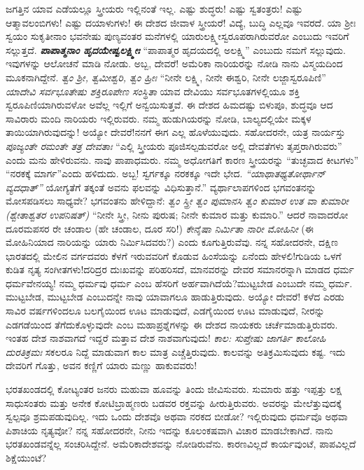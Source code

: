 ಜಗತ್ತಿನ ಯಾವ ಎಡೆಯಲ್ಲೂ ಸ್ತ್ರೀಯರು ಇಲ್ಲಿನಂತೆ ಇಲ್ಲ. ಎಷ್ಟು ಶುದ್ಧರು! ಎಷ್ಟು ಸ್ವತಂತ್ರರು! ಎಷ್ಟು ಆತ್ಮಾವಲಂಬಿಗಳು! ಎಷ್ಟು ದಯಾಳುಗಳು! ಈ ದೇಶದ ಜೀವಾಳ ಸ್ತ್ರೀಯರೆ! ವಿದ್ಯೆ, ಬುದ್ಧಿ ಎಲ್ಲವೂ ಇವರದೆ. ಯಾ ಶ‍್ರೀಃ ಸ್ವಯಂ ಸುಕೃತೀನಾಂ ಭವನೇಷು ಪುಣ್ಯವಂತರ ಮನೆಗಳಲ್ಲಿ ಯಾರುಲಕ್ಷ್ಮೀಸ್ವರೂಪರಾಗಿರುವರೋ ಎಂಬುದು ಇವರಿಗೆ ಸಲ್ಲುತ್ತದೆ. \textbf{\textit{ಪಾಪಾತ್ಮನಾಂ ಹೃದಯೇಷ್ವಲಕ್ಷ್ಮೀಃ}} “ಪಾಪಾತ್ಮರ ಹೃದಯದಲ್ಲಿ ಅಲಕ್ಷ್ಮಿ” ಎಂಬುದು ನಮಗೆ ಸಲ್ಲುವುದು. ಇವುಗಳನ್ನು ಆಲೋಚನೆ ಮಾಡಿ ನೋಡು. ಅಬ್ಬ, ದೇವರೆ! ಅಮೆರಿಕಾ ನಾರಿಯರನ್ನು ನೋಡಿ ನಾನು ವಿಸ್ಮಯದಿಂದ ಮೂಕನಾಗಿದ್ದೇನೆ. \textit{ತ್ವಂ ಶ‍್ರೀ, ತ್ವಮೀಶ್ವರಿ, ತ್ವಂ ಹ್ರೀಃ} “ನೀನೇ ಲಕ್ಷ್ಮಿ, ನೀನೇ ಈಶ್ವರಿ, ನೀನೇ ಲಜ್ಜಾಸ್ವರೂಪಿಣಿ” \textit{ಯಾದೇವಿ ಸರ್ವಭೂತೇಷು ಶಕ್ತಿರೂಪೇಣ ಸಂಸ್ಥಿತಾ} ಯಾವ ದೇವಿಯು ಸರ್ವಭೂತಗಳಲ್ಲಿಯೂ ಶಕ್ತಿ ಸ್ವರೂಪಿಣಿಯಾಗಿರುವಳೋ \enginline{-} ಅವೆಲ್ಲ ಇಲ್ಲಿಗೆ ಅನ್ವಯಿಸುತ್ತವೆ. ಈ ದೇಶದ ಹಿಮದಷ್ಟು ಬಿಳುಪೂ, ಶುದ್ಧವೂ ಆದ ಸಾವಿರಾರು ಮಂದಿ ನಾರಿಯರು ಇಲ್ಲಿರುವರು. ನಮ್ಮ ಹುಡುಗಿಯರನ್ನು ನೋಡಿ, ಬಾಲ್ಯದಲ್ಲಿಯೇ ಮಕ್ಕಳ ತಾಯಿಯಾಗಿರುವುದನ್ನು! ಅಯ್ಯೋ ದೇವರೆ!ನನಗೆ ಈಗ ಎಲ್ಲ ಹೊಳೆಯುವುದು. ಸಹೋದರನೇ, ಯತ್ರ ನಾರ್ಯಸ್ತು \textit{ಪೂಜ್ಯಂತೇ ರಮಂತೇ ತತ್ರ ದೇವತಾಃ} “ಎಲ್ಲಿ ಸ್ತ್ರೀಯರು ಪೂಜಿಸಲ್ಪಡುವರೋ ಅಲ್ಲಿ ದೇವತೆಗಳು ತೃಪ್ತರಾಗಿರುವರು” ಎಂದು ಮನು ಹೇಳಿರುವನು. ನಾವು ಪಾಪಾಧಮರು. ನಮ್ಮ ಅಧೋಗತಿಗೆ ಕಾರಣ ಸ್ತ್ರೀಯರನ್ನು “ತುಚ್ಛವಾದ ಕೀಟಗಳು” “ನರಕಕ್ಕೆ ಮಾರ್ಗ”ಎಂದು ಹಳಿದುದು. ಅಬ್ಬ! ಸ್ವರ್ಗಕ್ಕೂ ನರಕಕ್ಕೂ ಇದೇ ಭೇದ. \textit{ “ಯಾಥಾತಥ್ಯತೋರ್ಥಾನ್ ವ್ಯದಧಾತ್”} ಯೋಗ್ಯತೆಗೆ ತಕ್ಕಂತೆ ಅವನು ಫಲವನ್ನು ವಿಧಿಸುತ್ತಾನೆ.” ವ್ಯರ್ಥಾಲಾಪಗಳಿಂದ ಭಗವಂತನನ್ನು ಮೋಸಪಡಿಸಲು ಸಾಧ್ಯವೇ? ಭಗವಂತನು ಹೇಳಿದ್ದಾನೆ: \textit{ತ್ವಂ ಸ್ತ್ರೀ ತ್ವಂ ಪುಮಾನಸಿ ತ್ವಂ ಕುಮಾರ ಉತ ವಾ ಕುಮಾರೀ (ಶ್ವೇತಾಶ್ವತರ ಉಪನಿಷತ್)} “ನೀನೇ ಸ್ತ್ರೀ, ನೀನು ಪುರುಷ; ನೀನೇ ಕುಮಾರ ಮತ್ತು ಕುಮಾರಿ.” ಆದರೆ ನಾವಾದರೋ ದೂರಮಪಸರ ರೇ ಚಂಡಾಲ (ಹೇ ಚಂಡಾಲ, ದೂರ ಸರಿ!) \textit{ಕೇನೈಷಾ ನಿರ್ಮಿತಾ ನಾರೀ ಮೋಹಿನೀ} (ಈ ಮೋಹಿನಿಯಾದ ನಾರಿಯನ್ನು ಯಾರು ನಿರ್ಮಿಸಿದವರು?) ಎಂದು ಕೂಗುತ್ತಿರುವೆವು. ನನ್ನ ಸಹೋದರನೇ, ದಕ್ಷಿಣ ಭಾರತದಲ್ಲಿ ಮೇಲಿನ ವರ್ಗದವರು ಕೆಳಗೆ ಇರುವವರಿಗೆ ಕೊಡುವ ಹಿಂಸೆಯನ್ನು ಏನೆಂದು ಹೇಳಲಿ!ಗುಡಿಯ ಒಳಗೆ ಕುಡಿತ ನೃತ್ಯ ಸಂಗೀತಗಳು!ದರಿದ್ರರ ದುಃಖವನ್ನು ಪರಿಹರಿಸದೆ, ಮಾನವರನ್ನು ದೇವರ ಸಮಾನರನ್ನಾಗಿ ಮಾಡದ ಧರ್ಮ ಧರ್ಮವೇನಯ್ಯ! ನಮ್ಮ ಧರ್ಮವು ಧರ್ಮ ಎಂಬ ಹೆಸರಿಗೆ ಅರ್ಹವಾಗಿದೆಯೆ?ಮುಟ್ಟಬೇಡ ಎಂಬುದೇ ನಮ್ಮ ಧರ್ಮ. ಮುಟ್ಟಬೇಡ, ಮುಟ್ಟಬೇಡ ಎಂಬುದನ್ನೇ ನಾವು ಯಾವಾಗಲೂ ಹಾಡುತ್ತಿರುವುದು. ಅಯ್ಯೋ ದೇವರೆ! ಕಳೆದ ಎರಡು ಸಾವಿರ ವರ್ಷಗಳಿಂದಲೂ ಬಲಗೈಯಿಂದ ಊಟ ಮಾಡುವುದೆ, ಎಡಗೈಯಿಂದ ಊಟ ಮಾಡುವುದೆ, ನೀರನ್ನು ಎಡಗಡೆಯಿಂದ ತೆಗೆದುಕೊಳ್ಳುವುದೇ ಎಂಬ ಮಹಾಪ್ರಶ್ನೆಗಳನ್ನು ಈ ದೇಶದ ನಾಯಕರು ಚರ್ಚೆಮಾಡುತ್ತಿರುವರು. ಇಂತಹ ದೇಶ ನಾಶವಾಗದೆ ಇದ್ದರೆ ಮತ್ತಾವ ದೇಶ ನಾಶವಾಗುವುದು! \textit{ಕಾಲ: ಸುಪ್ತೇಷು ಜಾಗರ್ತಿ ಕಾಲೋಹಿ ದುರತಿಕ್ರಮಃ} ಸಕಲರೂ ನಿದ್ದೆ ಮಾಡುವಾಗ ಕಾಲ ಮಾತ್ರ ಎಚ್ಚೆತ್ತಿರುವುದು. ಕಾಲವನ್ನು ಅತಿಕ್ರಮಿಸುವುದು ಕಷ್ಟ. ಇದು ದೇವರಿಗೆ ಗೊತ್ತು, ಅವನ ಕಣ್ಣಿಗೆ ಯಾರು ಮಣ್ಣು ಹಾಕುವವರು!

ಭರತಖಂಡದಲ್ಲಿ ಕೋಟ್ಯಂತರ ಜನರು ಮಹುವಾ ಹೂವನ್ನು ತಿಂದು ಜೀವಿಸುವರು. ಸುಮಾರು ಹತ್ತು ಇಪ್ಪತ್ತು ಲಕ್ಷ ಸಾಧುಸಂತರು ಮತ್ತು ಅನೇಕ ಕೋಟಿಬ್ರಾಹ್ಮಣರು ಬಡವರ ರಕ್ತವನ್ನು ಹೀರುತ್ತಿರುವರು. ಅವರನ್ನು ಮೇಲೆತ್ತುವುದಕ್ಕೆ ಸ್ವಲ್ಪವೂ ಶ್ರಮಪಡುವುದಿಲ್ಲ. ಇದು ಒಂದು ದೇಶವೊ ಅಥವಾ ನರಕದ ಬೀಡೋ? ಇಲ್ಲಿರುವುದು ಧರ್ಮವೊ ಅಥವಾ ಪಿಶಾಚಿಯ ನೃತ್ಯವೋ? ನನ್ನ ಸಹೋದರನೇ, ನೀನು ಇದನ್ನು ಕೂಲಂಕಷವಾಗಿ ವಿಚಾರ ಮಾಡಬೇಕಾಗಿದೆ. ನಾನು ಭರತಖಂಡವನ್ನೆಲ್ಲ ಸಂಚರಿಸಿದ್ದೇನೆ. ಅಮೆರಿಕಾದೇಶವನ್ನು ನೋಡಿರುವೆನು. ಕಾರಣವಿಲ್ಲದೆ ಕಾರ್ಯವುಂಟೆ, ಪಾಪವಿಲ್ಲದೆ ಶಿಕ್ಷೆಯುಂಟೆ?

